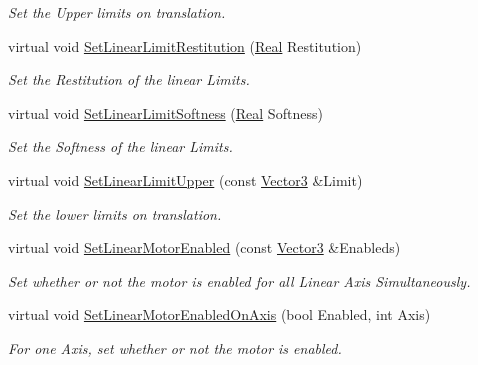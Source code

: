 \begin{DoxyCompactItemize}
\begin{DoxyCompactList}\small\item\em Set the Upper limits on translation. \item\end{DoxyCompactList}\item 
virtual void \hyperlink{classMezzanine_1_1Generic6DofConstraint_ace6ec95d4d7332e7320ab86e0a2d9f90}{SetLinearLimitRestitution} (\hyperlink{namespaceMezzanine_a726731b1a7df72bf3583e4a97282c6f6}{Real} Restitution)
\begin{DoxyCompactList}\small\item\em Set the Restitution of the linear Limits. \item\end{DoxyCompactList}\item 
virtual void \hyperlink{classMezzanine_1_1Generic6DofConstraint_aac70c40e57b9a0cefaf99a858a17d9f7}{SetLinearLimitSoftness} (\hyperlink{namespaceMezzanine_a726731b1a7df72bf3583e4a97282c6f6}{Real} Softness)
\begin{DoxyCompactList}\small\item\em Set the Softness of the linear Limits. \item\end{DoxyCompactList}\item 
virtual void \hyperlink{classMezzanine_1_1Generic6DofConstraint_a11540d7b783086bda6f0ccf6bb9e316d}{SetLinearLimitUpper} (const \hyperlink{classMezzanine_1_1Vector3}{Vector3} \&Limit)
\begin{DoxyCompactList}\small\item\em Set the lower limits on translation. \item\end{DoxyCompactList}\item 
virtual void \hyperlink{classMezzanine_1_1Generic6DofConstraint_a507204d3dcb84608b6e69ac3410cb2fc}{SetLinearMotorEnabled} (const \hyperlink{classMezzanine_1_1Vector3}{Vector3} \&Enableds)
\begin{DoxyCompactList}\small\item\em Set whether or not the motor is enabled for all Linear Axis Simultaneously. \item\end{DoxyCompactList}\item 
virtual void \hyperlink{classMezzanine_1_1Generic6DofConstraint_a28b2398edd33f7af4043acce4d4e9893}{SetLinearMotorEnabledOnAxis} (bool Enabled, int Axis)
\begin{DoxyCompactList}\small\item\em For one Axis, set whether or not the motor is enabled. \item\end{DoxyCompactList}\item 

\end{DoxyCompactItemize}
